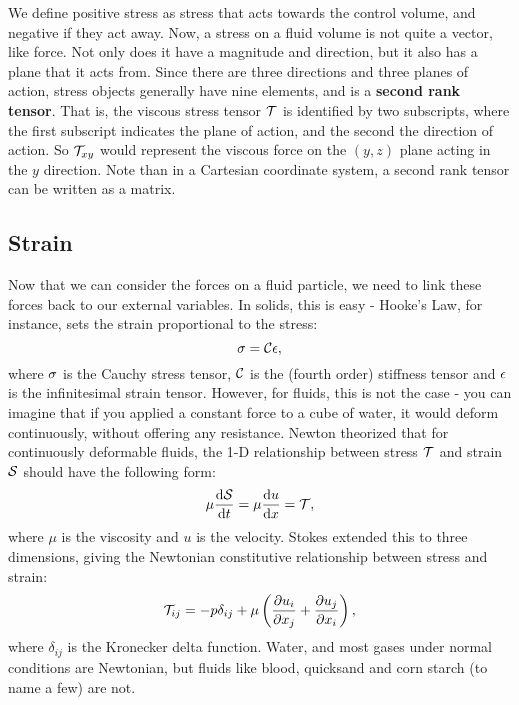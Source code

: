 We define positive stress as stress that acts towards the control volume, and negative if they act away. Now, a stress on a fluid volume is not quite a vector, like force. Not only does it have a magnitude and direction, but it also has a plane that it acts from. Since there are three directions and three planes of action, stress objects generally have nine elements, and is a {\bf second rank tensor}. That is, the viscous stress tensor $\mathcal{T}$ is identified by two subscripts, where the first subscript indicates the plane of action, and the second the direction of action. So $\mathcal{T}_{xy}$ would represent the viscous force on the $(y,z)$ plane acting in the $y$ direction. Note than in a Cartesian coordinate system, a second rank tensor can be written as a matrix. 

\subsection{Strain}
Now that we can consider the forces on a fluid particle, we need to link these forces back to our external variables. In solids, this is easy - Hooke's Law, for instance, sets the strain proportional to the stress:
\begin{equation}
\mathbf{\sigma} = \mathcal{C}\mathbf{\epsilon},
\end{equation}
where $\mathbf{\sigma}$ is the Cauchy stress tensor, $\mathcal{C}$ is the (fourth order) stiffness tensor and $\mathbf{\epsilon}$ is the infinitesimal strain tensor. However, for fluids, this is not the case - you can imagine that if you applied a constant force to a cube of water, it would deform continuously, without offering any resistance. Newton theorized that for continuously deformable fluids, the 1-D relationship between stress $\mathcal{T}$ and strain $\mathcal{S}$ should have the following form:
\begin{equation}
\mu \der{1}{\Tensor{S}}{t} = \mu \der{1}{u}{x}=\Tensor{T}, 
\end{equation}
where $\mu$ is the viscosity and $u$ is the velocity.  Stokes extended this to three dimensions, giving the Newtonian constitutive relationship between stress and strain:
\begin{equation}\label{eq:constitutive}
\Tensor{T}_{ij} = -p\delta_{ij} + \mu\paren{\pder{1}{u_{i}}{x_j} + \pder{1}{u_j}{x_i}},
\end{equation}
where $\delta_{ij}$ is the Kronecker delta function. Water, and most gases under normal conditions are Newtonian, but fluids like blood, quicksand and corn starch (to name a few) are not. 


